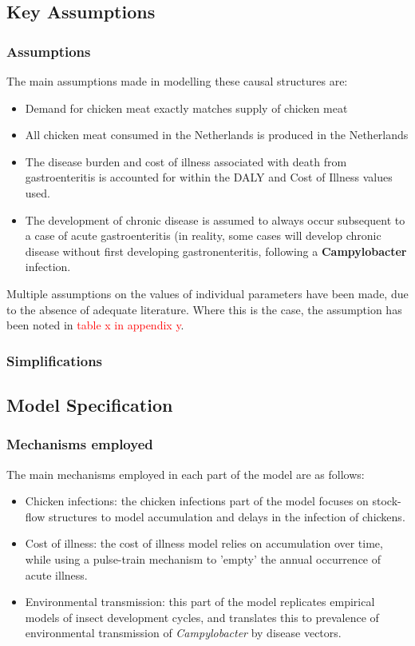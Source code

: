 \subsection{Key Assumptions}
\subsubsection{Assumptions}
The main assumptions made in modelling these causal structures are:
\begin{itemize}
    \item Demand for chicken meat exactly matches supply of chicken meat
    \item All chicken meat consumed in the Netherlands is produced in the Netherlands
    \item The disease burden and cost of illness associated with death from gastroenteritis is accounted for within the DALY and Cost of Illness values used.
    \item The development of chronic disease is assumed to always occur subsequent to a case of acute gastroenteritis (in reality, some cases will develop chronic disease without first developing gastronenteritis, following a \textbf{Campylobacter} infection.
\end{itemize}

Multiple assumptions on the values of individual parameters have been made, due to the absence of adequate literature. Where this is the case, the assumption has been noted in \textcolor{red}{table x in appendix y}.
\subsubsection{Simplifications}

\subsection{Model Specification}
\subsubsection{Mechanisms employed}
The main mechanisms employed in each part of the model are as follows:
\begin{itemize}
    \item Chicken infections: the chicken infections part of the model focuses on stock-flow structures to model accumulation and delays in the infection of chickens.
    \item Cost of illness: the cost of illness model relies on accumulation over time, while using a pulse-train mechanism to 'empty' the annual occurrence of acute illness.
    \item Environmental transmission: this part of the model replicates empirical models of insect development cycles, and translates this to prevalence of environmental transmission of \textit{Campylobacter} by disease vectors.
\end{itemize}

